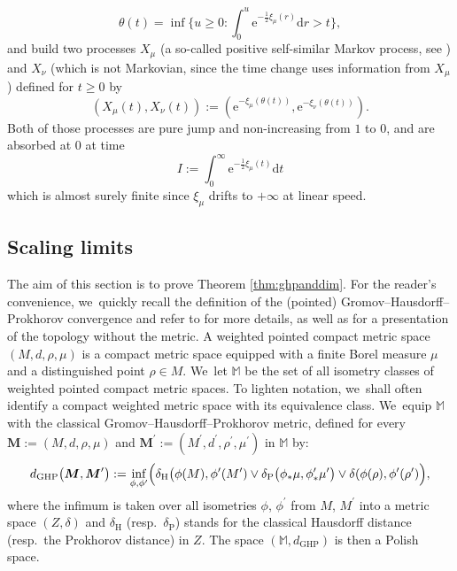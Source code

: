 \documentclass[11pt]{article}
\theoremstyle{definition}
\begin{document}
\begin{equation}\label{eq:timechange}\theta(t)=\inf\biggl\{u\geq 0: \int_0^u \mathrm{e}^{-\frac12 \xi_{\mu}(r)}\mathrm d r > t\biggr\},\end{equation}
and build two processes $X_\mu$ (a so-called positive self-similar Markov process, see \cite{Lamp62}) and $X_\nu$ (which is not Markovian, since the time change uses information from $X_\mu$) defined for $t\geq0$ by
\begin{equation}
(X_{\mu}(t),X_\nu(t)):=(\mathrm{e}^{-\xi_\mu(\theta(t))},\mathrm{e}^{-\xi_\nu(\theta(t))}). \label{eq:lamperti}\end{equation}
Both of those processes are pure jump and non-increasing from $1$ to $0$, and are absorbed at $0$ at time \begin{equation} \label{def:I} I:=\int_{0}^{\infty}\mathrm{e}^{-\frac12 \xi_\mu(t)}\mathrm{d}t\end{equation} which is almost surely finite since $ \xi_\mu$ drifts to $+\infty$ at linear speed.


\subsection{Scaling limits}\label{sec:scalinglimitproof}
The aim of this section is to prove Theorem \ref{thm:ghpanddim}. For the reader's convenience, we~quickly recall the definition of the (pointed) Gromov--Hausdorff--Prokhorov convergence and refer to \cite{MR3035742,khezeli2020metrization} for more details, as well as \cite{AthreayLorWinter} for a presentation of the topology without the metric. A weighted pointed compact metric space $(M,d,\rho,\mu)$ is a compact metric space equipped with a finite Borel measure $\mu$ and a distinguished point $\rho\in M$. We~let $\mathbb{M}$ be the set of all isometry classes of weighted pointed compact metric spaces. To lighten notation, we~shall often identify a compact weighted metric space with its equivalence class. We~equip $\mathbb{M}$ with the classical Gromov--Hausdorff--Prokhorov metric, defined for every $\boldsymbol{M}:=(M,d, \rho,\mu)$ and $\boldsymbol{M}^{\prime}:=(M^{\prime},d^{{\prime}},\rho^\prime,\mu^{\prime})$ in $\mathbb{M}$ by:
\[
d_{\mathrm{GHP}}\big(\boldsymbol{M},\boldsymbol{M}^{\prime}\big):=\inf\limits_{\phi,\phi^{\prime}}\Bigl(\delta_{\text{H}}\big(\phi(M),\phi^{\prime}(M^{\prime})\vee \delta_{\text{P}}\big(\phi_* \mu,\phi^{\prime}_* \mu^{\prime}\big)\vee \delta(\phi(\rho),\phi^\prime(\rho^\prime)\Bigr),
\]
where the infimum is taken over all isometries $\phi$, $\phi^{\prime}$ from $M$, $M^{\prime}$ into a metric space $(Z, \delta)$ and $\delta_{\text{H}}$ (resp.~$\delta_{\text{P}}$) stands for the classical Hausdorff distance (resp.~the Prokhorov distance) in $Z$. The space $(\mathbb{M},d_{\mathrm{GHP}})$ is then a Polish space.
\end{document}
